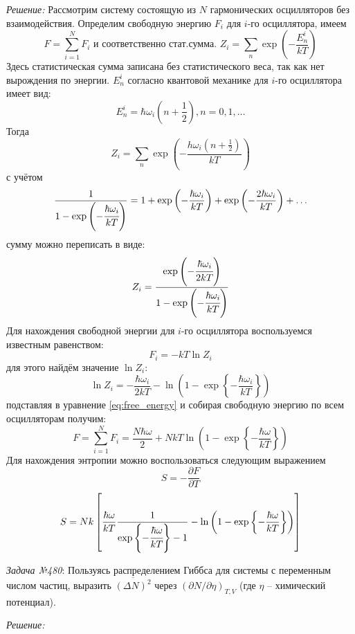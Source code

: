 \documentclass[14pt,final,titlepage,pscyr]{hedwork}
\begin{document}
\emph{Решение:} Рассмотрим систему состоящую из \( N \) гармонических 
осцилляторов без взаимодействия. Определим свободную энергию \( F_i \) для 
\( i \)-го осциллятора, имеем
\[
	F = \sum\limits_{i=1}^{N} F_i \text{ и соответственно стат.сумма. }
	Z_i = \sum\limits_{n} \exp\left( -\frac{E_n^i}{kT} \right)
\]
Здесь статистическая сумма записана без статистического веса, так как нет 
вырождения по энергии. \( E_n^i \) согласно квантовой механике для 
\( i \)-го осциллятора имеет вид:
\[
	E^i_n = \hbar\omega_i \left( n + \frac{1}{2} \right), n = 0, 1, \ldots
\]
Тогда
\[
	Z_i = \sum\limits_n \exp\left( -\frac{h\omega_i
		\left( n + \frac{1}{2} \right)}{kT} \right)
\]
с учётом
\[
	\frac{1}{1-\exp\left( -\cfrac{\hbar\omega_i}{kT} \right)} = 1 + 
		\exp\left( -\frac{\hbar\omega_i}{kT} \right) + 
		\exp\left( -\frac{2\hbar\omega_i}{kT} \right) + \ldots
\]
сумму можно переписать в виде:
\[
	Z_i = \frac{\exp\left( -\cfrac{\hbar\omega_i}{2kT} \right)}
		{1-\exp\left( -\cfrac{\hbar\omega_i}{kT} \right)}
\]
Для нахождения свободной энергии для \( i \)-го осциллятора воспользуемся 
известным равенством:
\begin{equation}
	F_i = -kT\ln Z_i
	\label{eq:free_energy}
\end{equation}
для этого найдём значение \( \ln Z_i \):
\[
	\ln Z_i = -\frac{\hbar\omega_i}{2kT} - \ln\left( 1-\exp\left\{ 
		-\frac{\hbar\omega_i}{kT}\right\}\right)
\]
подставляя в уравнение \eqref{eq:free_energy} и собирая свободную энергию 
по всем осцилляторам получим:
\[
	F = \sum\limits_{i=1}^{N} F_i = \frac{N\hbar\omega}{2} + 
		NkT\ln\left( 1-\exp\left\{ -\frac{\hbar\omega}{kT}\right\}\right)
\]
Для нахождения энтропии можно воспользоваться следующим выражением
\[
	S = -\frac{\partial F}{\partial T}
\]
\[
	S = Nk\left[ \frac{\hbar\omega}{kT}
		\frac{1}{\exp\left\{-\cfrac{\hbar\omega}{kT}\right\}-1} - 
		\ln\left( 1-\exp\left\{ -\frac{\hbar\omega}{kT}\right\}\right) 
	\right]
\]

\newpage

\emph{Задача №480}: Пользуясь распределением Гиббса для системы с переменным 
числом частиц, выразить \( \overline{(\Delta N)^2} \) через 
\( \left( \partial N / \partial \eta \right)_{T,V} \) (где \( \eta \) -- 
химический потенциал).

\emph{Решение:}
\newpage
\end{document}
